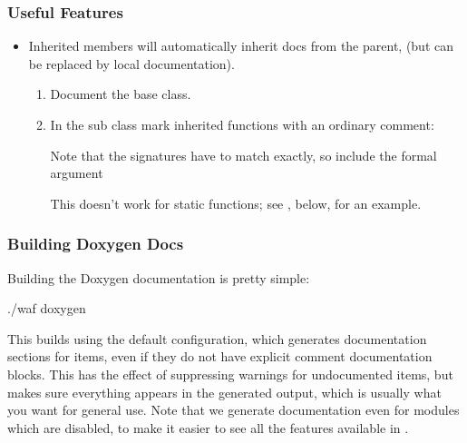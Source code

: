 \documentclass[letterpaper,10pt,english]{sphinxmanual}
\renewcommand{\sphinxcode}[1]{\texttt{\small{#1}}}
\begin{document}
\subsubsection{Useful Features}
\label{\detokenize{documentation:useful-features}}\begin{itemize}
\item {} 
Inherited members will automatically inherit docs from the parent,
(but can be replaced by local documentation).
\begin{enumerate}
%
\item {} 
Document the base class.

\item {} 
In the sub class mark inherited functions with an ordinary comment:

\begin{sphinxVerbatim}[commandchars=\\\{\}]
   
    
\end{sphinxVerbatim}

Note that the signatures have to match exactly, so include the formal
argument \sphinxcode{}

This doesn’t work for static functions; see \sphinxcode{}, below, for an
example.

\end{enumerate}

\end{itemize}


\subsubsection{Building Doxygen Docs}
\label{\detokenize{documentation:building-doxygen-docs}}
Building the Doxygen documentation is pretty simple:

\begin{sphinxVerbatim}[commandchars=\\\{\}]
\PYGZdl{} ./waf doxygen
\end{sphinxVerbatim}

This builds using the default configuration, which generates
documentation sections for  items, even if they do not have
explicit comment documentation blocks.  This has the effect of
suppressing warnings for undocumented items, but makes sure everything
appears in the generated output, which is usually what you want for
general use.  Note that we generate documentation even for modules
which are disabled, to make it easier to see all the features
available in .
\end{document}
